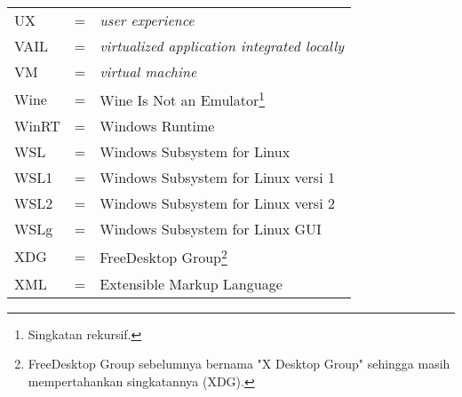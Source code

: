 \begin{longtable}{llp{3in}}
    UX & \hspace{1.5cm} = & \textit{user experience}\\
    VAIL & \hspace{1.5cm} = & \textit{virtualized application integrated locally}\\
    VM & \hspace{1.5cm} = & \textit{virtual machine}\\
    Wine & \hspace{1.5cm} = & Wine Is Not an Emulator\footnote{Singkatan rekursif.}\\
    WinRT & \hspace{1.5cm} = & Windows Runtime\\
    WSL & \hspace{1.5cm} = & Windows Subsystem for Linux\\
    WSL1 & \hspace{1.5cm} = & Windows Subsystem for Linux versi 1\\
    WSL2 & \hspace{1.5cm} = & Windows Subsystem for Linux versi 2\\
    WSLg & \hspace{1.5cm} = & Windows Subsystem for Linux GUI\\
    XDG & \hspace{1.5cm} = & FreeDesktop Group\footnote{FreeDesktop Group sebelumnya bernama "X Desktop Group" sehingga masih mempertahankan singkatannya (XDG).}\\
    XML & \hspace{1.5cm} = & Extensible Markup Language
\end{longtable}
